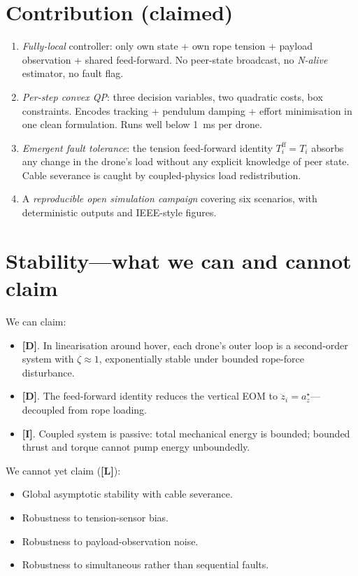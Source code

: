 \documentclass[11pt,a4paper,oneside]{report}
\newcommand{\Der}{\textcolor{blue!60!black}{\textbf{[D]}}}
\newcommand{\Inf}{\textcolor{orange!70!black}{\textbf{[I]}}}
\newcommand{\Lim}{\textcolor{red!60!black}{\textbf{[L]}}}
\begin{document}
\section{Contribution (claimed)}
\begin{enumerate}
\item \emph{Fully-local} controller: only own state + own rope
tension + payload observation + shared feed-forward. No peer-state
broadcast, no \emph{N-alive} estimator, no fault flag.
\item \emph{Per-step convex QP}: three decision variables, two
quadratic costs, box constraints. Encodes tracking + pendulum
damping + effort minimisation in one clean formulation. Runs well
below 1~ms per drone.
\item \emph{Emergent fault tolerance}: the tension feed-forward
identity $T_i^\text{ff} = T_i$ absorbs any change in the drone's
load without any explicit knowledge of peer state. Cable severance
is caught by coupled-physics load redistribution.
\item A \emph{reproducible open simulation campaign} covering six
scenarios, with deterministic outputs and IEEE-style figures.
\end{enumerate}

\section{Stability---what we can and cannot claim}

We can claim:
\begin{itemize}
\item \Der. In linearisation around hover, each drone's outer loop is
a second-order system with $\zeta\approx 1$, exponentially stable
under bounded rope-force disturbance.
\item \Der. The feed-forward identity reduces the vertical EOM to
$\ddot z_i = a_z^\star$---decoupled from rope loading.
\item \Inf. Coupled system is passive: total mechanical energy is
bounded; bounded thrust and torque cannot pump energy unboundedly.
\end{itemize}

We cannot yet claim (\Lim):
\begin{itemize}
\item Global asymptotic stability with cable severance.
\item Robustness to tension-sensor bias.
\item Robustness to payload-observation noise.
\item Robustness to simultaneous rather than sequential faults.
\end{itemize}
\end{document}
